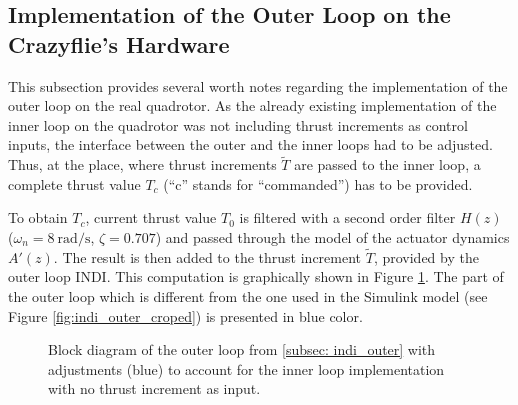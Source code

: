 \documentclass[11pt, a4paper, twoside]{report}
\begin{document}
\subsection{Implementation of the Outer Loop on the Crazyflie's Hardware} \label{subsec:outer_hardware_implementation}

This subsection provides several worth notes regarding the implementation of the outer loop on the real quadrotor. As the already existing implementation of the inner loop on the quadrotor was not including thrust increments as control inputs, the interface between the outer and the inner loops had to be adjusted. Thus, at the place, where thrust increments $\tilde{T}$ are passed to the inner loop, a complete thrust value $T_c$ (``c'' stands for ``commanded'') has to be provided.

To obtain $T_c$, current thrust value $T_0$ is filtered with a second order filter $H(z)$ ($\omega_n=8~\si{\radian/\second}$, $\zeta=0.707$) and passed through the model of the actuator dynamics $A'(z)$. The result is then added to the thrust increment $\tilde{T}$, provided by the outer loop \acrshort{INDI}. This computation is graphically shown in Figure \ref{fig:outer_loop_hw}. The part of the outer loop which is different from the one used in the Simulink model (see Figure \ref{fig:indi_outer_croped}) is presented in blue color. 

\begin{figure}[h]
	\centering 
	\captionsetup{justification=centering, singlelinecheck=off, font=bf, belowskip=-0.5cm}
	\caption[Block diagram of the outer loop with adjustments]{Block diagram of the outer loop from \ref{subsec: indi_outer} with adjustments (blue) to account for the inner loop implementation with no thrust increment as input.}
	\label{fig:outer_loop_hw}
\end{figure}
\end{document}
